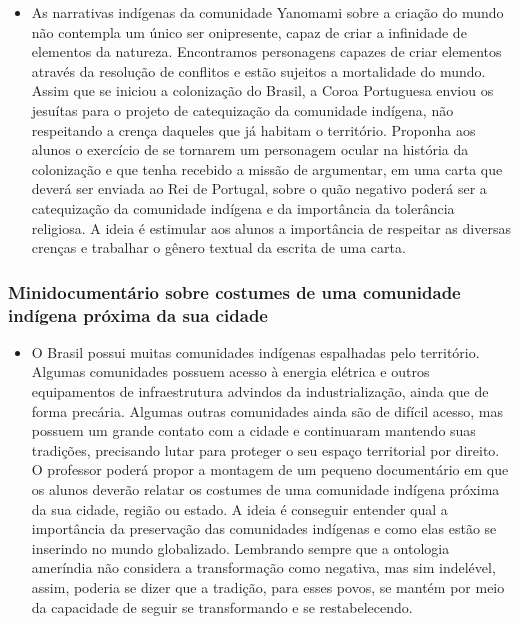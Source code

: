 \documentclass[12pt]{extarticle}
\begin{document}
\begin{itemize}
\item
  As narrativas indígenas da comunidade Yanomami sobre a criação do
  mundo não contempla um único ser onipresente, capaz de criar a
  infinidade de elementos da natureza. Encontramos personagens capazes
  de criar elementos através da resolução de conflitos e estão sujeitos
  a mortalidade do mundo. Assim que se iniciou a colonização do Brasil,
  a Coroa Portuguesa enviou os jesuítas para o projeto de catequização
  da comunidade indígena, não respeitando a crença daqueles que já
  habitam o território. Proponha aos alunos o exercício de se tornarem
  um personagem ocular na história da colonização e que tenha recebido a
  missão de argumentar, em uma carta que deverá ser enviada ao Rei de
  Portugal, sobre o quão negativo poderá ser a catequização da
  comunidade indígena e da importância da tolerância religiosa. A ideia
  é estimular aos alunos a importância de respeitar as diversas crenças
  e trabalhar o gênero textual da escrita de uma carta.
\end{itemize}


\subsubsection{Minidocumentário sobre costumes de uma comunidade indígena próxima da sua cidade}

\begin{itemize}
\item
  O Brasil possui muitas comunidades indígenas espalhadas pelo
  território. Algumas comunidades possuem acesso à energia elétrica e
  outros equipamentos de infraestrutura advindos da industrialização, ainda que de forma
  precária. Algumas outras comunidades ainda são de difícil acesso, mas
  possuem um grande contato com a cidade e continuaram mantendo suas
  tradições, precisando lutar para proteger o seu espaço territorial por
  direito. O professor poderá propor a montagem de um pequeno
  documentário em que os alunos deverão relatar os costumes de uma
  comunidade indígena próxima da sua cidade, região ou estado. A ideia é
  conseguir entender qual a importância da preservação das comunidades
  indígenas e como elas estão se inserindo no mundo globalizado. Lembrando sempre que 
  a ontologia ameríndia não considera a transformação como negativa, mas sim indelével, assim, 
  poderia se dizer que a tradição, para esses povos, se mantém por meio da capacidade de seguir
  se transformando e se restabelecendo.
\end{itemize}
\end{document}
